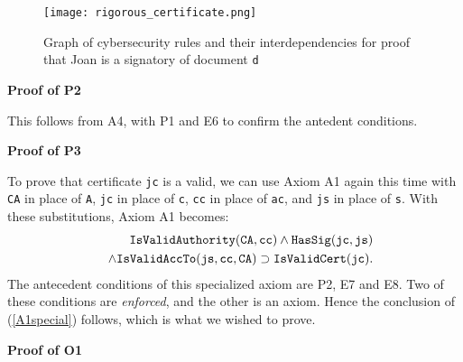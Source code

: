 \begin{figure}[bhpt]
	\begin{centering}
		\leavevmode\texttt{[image: rigorous\_certificate.png]}\ \\
			\caption{Graph of cybersecurity rules and their interdependencies for 
			proof that Joan is a signatory of document {\tt d}}\label{certificaterulesgraph}
	\end{centering}
		\vspace{-5mm}
\end{figure}

\iffalse
\begin{figure}[bhpt]
	\begin{centering}
		\leavevmode\texttt{[image: diagramCyse2.png]}\ \\
		\caption{A graph of cybersecurity rules, showing their statements}
	\end{centering}
\end{figure}
\fi

{\bf Proof of P2}

This follows from A4, with P1 and E6 to confirm the antedent conditions.

{\bf Proof of P3}

To prove that  certificate {\tt jc} is a valid, we can use Axiom A1 again
this time with {\tt CA} in place of {\tt A}, {\tt jc} in place of {\tt c}, 
{\tt cc} in place of {\tt ac}, 
and {\tt js} in place of {\tt s}.
With these substitutions,
Axiom A1 becomes:
\begin{eqnarray}\label{A2specific2} \nonumber
&&	\hbox{\tt IsValidAuthority}({\tt CA},{\tt cc}) \wedge \hbox{\tt HasSig}({\tt jc},{\tt js})\\ \nonumber
&&\wedge \hbox{\tt IsValidAccTo}({\tt js}, {\tt cc}, {\tt CA} ) 
\supset \hbox{\tt IsValidCert}({\tt jc}).
\end{eqnarray}
The antecedent conditions of this specialized axiom are
P2, E7 and E8. Two of these conditions are {\em enforced}, and the other is
an axiom. Hence the conclusion of (\ref{A1special}) follows, which
is what we wished to prove.

{\bf Proof of O1}


